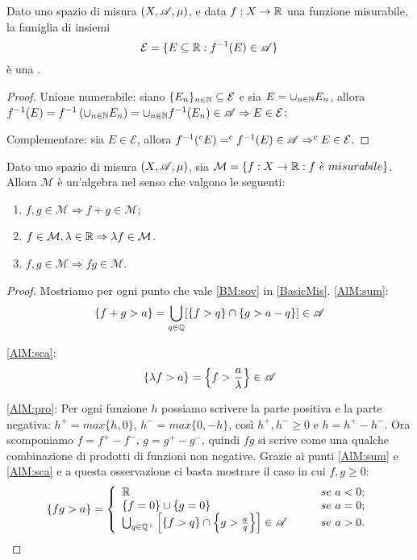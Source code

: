 \begin{proposition}
	\label{CounterImgMis}
	Dato uno spazio di misura $(X,\mathscr A,\mu)$, e data $f:X\rightarrow \mathbb R$ una funzione misurabile, la famiglia di insiemi
	\[
		\mathcal{E} = \{ E\subseteq \mathbb R : f^{-1}(E)\in \mathscr A \}
	\]
	è una \sigalg{}.
\end{proposition}
\begin{proof}
	Unione numerabile: siano $\{E_n\}_{n\in \mathbb N}\subseteq \mathcal{E}$ e sia $E = \cup_{n\in \mathbb N}E_n$,
	allora $f^{-1}(E)=f^{-1}\left(\cup_{n\in \mathbb N}E_n\right) = \cup_{n\in \mathbb N}f^{-1}(E_n)\in \mathscr A \Rightarrow E \in \mathcal{E}$;
	
	Complementare: sia $E\in \mathcal{E}$, allora $f^{-1}(^{c}E)= ^{c}f^{-1}(E)\in \mathscr A \Rightarrow ^{c}E \in \mathcal{E}$.
\end{proof}

\begin{proposition}
	\label{AlgMis}
	Dato uno spazio di misura $(X,\mathscr A,\mu)$, sia $\mathcal{M}=\{f:X\rightarrow \R : f\ \grave{e} \ misurabile\}$.
	Allora $\mathcal{M}$ è un'algebra nel senso che valgono le seguenti:
	\begin{enumerate}[label=(\arabic*),ref=(\arabic*)]
		\item $f,g\in \mathcal{M} \Rightarrow f+g\in \mathcal{M}$; \label{AlM:sum}
		\item $f\in \mathcal{M}, \lambda \in \mathbb R \Rightarrow \lambda f\in \mathcal{M}$. \label{AlM:sca}
		\item $f,g\in \mathcal{M} \Rightarrow fg\in \mathcal{M}$. \label{AlM:pro}
	\end{enumerate}
\end{proposition}
\begin{proof}
	Mostriamo per ogni punto che vale \ref{BM:sov} in \cref{BasicMis}.
	\ref{AlM:sum}: 
	\[
		\{f+g>a\}=\bigcup_{q\in \mathbb Q}[\{f>q\}\cap\{g>a-q\}]\in \mathscr A
	\]

	
	\ref{AlM:sca}:
	\[
		\{\lambda f>a\}=\left\{f>\frac{a}{\lambda}\right\}\in \mathscr A
	\]

	\ref{AlM:pro}: Per ogni funzione $h$ possiamo scrivere la parte positiva e la parte negativa: $h^+ = max\{h,0\}$, $h^- = max\{0,-h\}$,
	così $h^+,h^- \geq 0$ e $h = h^+ - h^-$. Ora scomponiamo $f=f^+ - f^-$, $g=g^+- g^-$, quindi $fg$ si scrive
	come una qualche combinazione di prodotti di funzioni non negative. Grazie ai punti \ref{AlM:sum} e \ref{AlM:sca} e a questa osservazione
	ci basta mostrare il caso in cui $f,g\geq0$:
	\[
		\{fg>a\}=\left\{\begin{array}{ll}
			\mathbb R &\qquad se\ a<0;\\
			\{f=0\}\cup\{g=0\} &\qquad se\ a=0;\\
			\bigcup_{q\in \mathbb Q^+}\left[\{f>q\}\cap\left\{g>\frac{a}{q}\right\}\right]\in \mathscr A &\qquad se\ a>0.
		\end{array}\right.
	\]
\end{proof}

